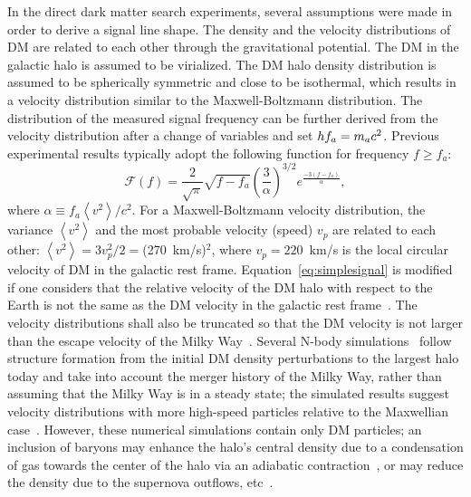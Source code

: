 In the direct dark matter search experiments, several assumptions were 
made in order to derive a signal line shape. 
The density and the velocity distributions of DM are related to each other 
through the gravitational potential. The DM in the galactic halo is assumed 
to be virialized. The DM halo density distribution is assumed 
to be spherically symmetric and close to be isothermal, which results in a 
velocity distribution similar to the Maxwell-Boltzmann distribution. The 
distribution of the measured signal frequency can be further derived from the 
velocity distribution after a change of variables and set 
\(hf_a = m_a c^2\). Previous experimental results typically adopt the 
following function for frequency $f\ge f_a$: 
\begin{equation}
\mathcal{F}(f) = \frac{2}{\sqrt{\pi}}\sqrt{f-f_a}\left(\frac{3}{\alpha}\right)^{3/2}
e^{\frac{-3\left(f-f_a\right)}{\alpha}}, 
\label{eq:simplesignal}
\end{equation}
where $\alpha\equiv  f_a \left<v^2\right>/c^2$. For a Maxwell-Boltzmann velocity 
distribution, the variance $\left<v^2\right>$ and the most probable velocity 
(speed) $v_p$ are related to each other:
$\left<v^2\right>=3v_p^2/2=$(270~km/s)$^2$, where $v_p=220$~km/s is the local 
circular velocity of DM in the galactic rest frame. 
Equation~\eqref{eq:simplesignal} 
is modified if one considers that the relative velocity of the DM halo with 
respect to the Earth is not the same as the DM velocity in the galactic rest 
frame~\cite{SignalLineShapeI}. The velocity distributions shall also be 
truncated so that the DM velocity is not larger than the escape velocity of 
the Milky Way~\cite{Lisanti:2016jxe}. 
Several N-body simulations~\cite{Diemand:2008in,Springel:2008cc} follow 
structure formation from the initial DM density perturbations to the largest 
halo today and take into account the merger history of the Milky Way, rather 
than assuming that the Milky Way is in a steady state; the simulated results 
 suggest velocity distributions with more high-speed particles relative 
to the Maxwellian case~\cite{Navarro:1995iw,Burkert:1995yz}. However, these 
numerical simulations contain only DM particles; an inclusion of baryons may 
enhance the halo's central density due to a condensation of gas towards the 
center of the halo via an adiabatic 
contraction~\cite{Blumenthal:1985qy,Gnedin:2004cx}, or may reduce 
the density due to the supernova outflows, etc~\cite{Mashchenko:2007jp,Governato:2009bg}. 


